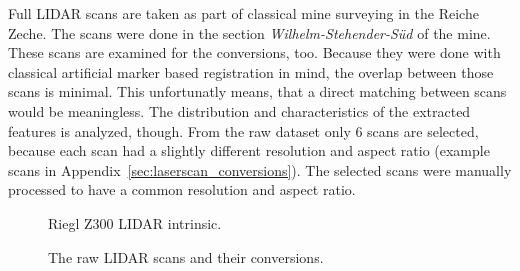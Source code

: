 Full \acrshort{LIDAR} scans are taken as part of classical mine surveying in the Reiche Zeche.
The scans were done in the section \emph{Wilhelm-Stehender-Süd} of the mine.
These scans are examined for the conversions, too.
Because they were done with classical artificial marker based registration in mind, the overlap between those scans is minimal.
This unfortunatly means, that a direct matching between scans would be meaningless.
The distribution and characteristics of the extracted features is analyzed, though.
From the raw dataset only 6 scans are selected, because each scan had a slightly different resolution and aspect ratio (example scans in Appendix~\ref{sec:laserscan_conversions}).
The selected scans were manually processed to have a common resolution and aspect ratio.
\begin{figure}[H]
\CenterFloatBoxes%
\begin{floatrow}
    {\caption{Riegl Z300 \acrshort{LIDAR} intrinsic.}\label{tab:scan_intrinsic}}%
    {\caption{The raw \acrshort{LIDAR} scans and their conversions.}\label{fig:scans}}
\end{floatrow}
\end{figure}


